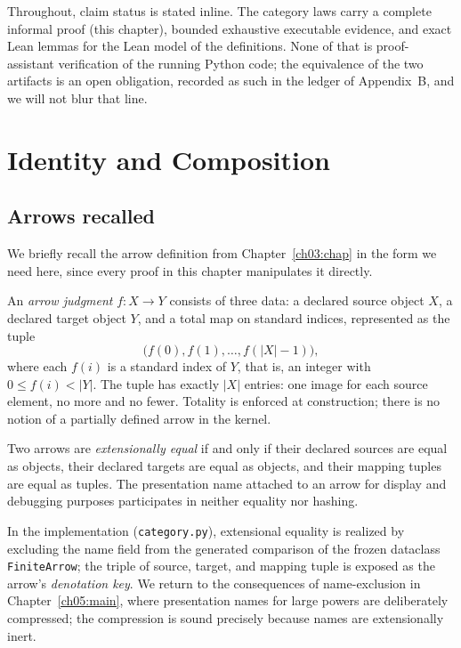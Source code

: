 Throughout, claim status is stated inline. The category laws carry a complete
informal proof (this chapter), bounded exhaustive executable evidence, and
exact Lean lemmas for the Lean model of the definitions. None of that is
proof-assistant verification of the running Python code; the equivalence of
the two artifacts is an open obligation, recorded as such in the ledger of
Appendix~B, and we will not blur that line.

\section{Identity and Composition}
\label{ch04:sec:defs}

\subsection{Arrows recalled}

We briefly recall the arrow definition from Chapter~\ref{ch03:chap} in the
form we need here, since every proof in this chapter manipulates it directly.

\begin{definition}
\label{ch04:def:arrow}
An \emph{arrow judgment} $f : X \to Y$ consists of three data: a declared
source object $X$, a declared target object $Y$, and a total map on standard
indices, represented as the tuple
\[
  \bigl(f(0), f(1), \dots, f(|X|-1)\bigr),
\]
where each $f(i)$ is a standard index of $Y$, that is, an integer with
$0 \le f(i) < |Y|$. The tuple has exactly $|X|$ entries: one image for each
source element, no more and no fewer. Totality is enforced at construction;
there is no notion of a partially defined arrow in the kernel.
\end{definition}

\begin{definition}
\label{ch04:def:extensional}
Two arrows are \emph{extensionally equal} if and only if their declared
sources are equal as objects, their declared targets are equal as objects,
and their mapping tuples are equal as tuples. The presentation name attached
to an arrow for display and debugging purposes participates in neither
equality nor hashing.
\end{definition}

In the implementation (\texttt{category.py}), extensional equality is
realized by excluding the name field from the generated comparison of the
frozen dataclass \texttt{FiniteArrow}; the triple of source, target, and
mapping tuple is exposed as the arrow's \emph{denotation key}. We return to
the consequences of name-exclusion in Chapter~\ref{ch05:main}, where
presentation names for large powers are deliberately compressed; the
compression is sound precisely because names are extensionally inert.

